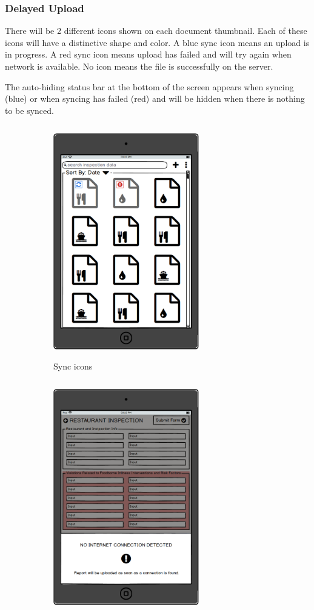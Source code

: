 \documentclass[twoside,letterpaper]{article}
\begin{document}
{\newpage
\subsubsection[Delayed Upload]{\rmfamily\bfseries\color{black}
Delayed Upload}
There will be 2 different icons shown on each document thumbnail. Each of these icons will have a distinctive shape and color. A blue sync icon means an upload is in progress. A red sync icon means upload has failed and will try again when network is available. No icon means the file is successfully on the server.
\newline

\noindent The auto-hiding status bar at the bottom of the screen appears when syncing (blue) or when syncing has failed (red) and will be hidden when there is nothing to be synced.
\begin{figure}
    \centering
    \begin{subfigure}[t]{0.4\textwidth}
  \includegraphics[width=2.5in,height=4in]{Delayed_Upload_Main_Screen.png}
  \caption{Sync icons}
    \end{subfigure}
    \qquad
    \begin{subfigure}[t]{0.4\textwidth}
  \includegraphics[width=2.5in,height=4in]{Delayed_Upload_Modal.png}

\end{subfigure}
\end{figure}}
\end{document}
